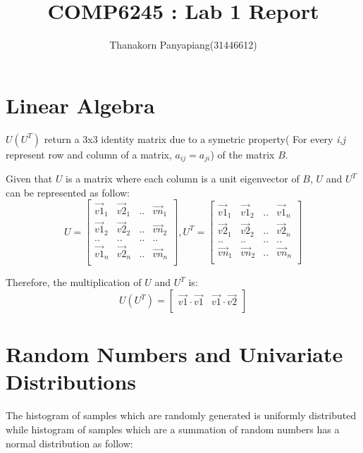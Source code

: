\documentclass{article}
\title{COMP6245 : Lab 1 Report}
\author{Thanakorn Panyapiang(31446612)}
\begin{document}
\maketitle
\section{Linear Algebra}
$U(U^{T})$ return a 3x3 identity matrix due to a symetric property( For every \textit{i,j} represent row and column of a matrix, $a_{ij} = a_{ji}$) of the matrix $B$.

Given that $U$ is a matrix where each column is a unit eigenvector of $B$, $U$ and $U^{T}$ can be represented as follow:
$$
U = \begin{bmatrix} 
\vec{v1}_{1} & \vec{v2}_{1} & .. & \vec{vn}_{1}\\
\vec{v1}_{2} & \vec{v2}_{2} & .. & \vec{vn}_{2}\\
..	& .. & .. & .. \\
\vec{v1}_{n} & \vec{v2}_{n} & .. & \vec{vn}_{n}\\
\end{bmatrix},
U^{T} = \begin{bmatrix}
\vec{v1}_{1} & \vec{v1}_{2} & .. & \vec{v1}_{n}\\
\vec{v2}_{1} & \vec{v2}_{2} & .. & \vec{v2}_{n}\\
.. & .. & .. & ..\\
\vec{vn}_{1} & \vec{vn}_{2} & .. & \vec{vn}_{n}\\
\end{bmatrix}
$$

Therefore, the multiplication of $U$ and $U^{T}$ is:
$$
U(U^{T}) = \begin{bmatrix}
\vec{v1}\cdot\vec{v1} & \vec{v1}\cdot\vec{v2}\\
\end{bmatrix}
$$

\maketitle
\section{Random Numbers and Univariate Distributions}
The histogram of samples which are randomly generated is uniformly distributed while histogram of samples which are a summation of random numbers has a normal distribution as follow:
\end{document}
